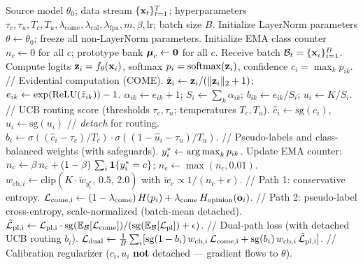 \begin{algorithm}[t]
\caption{UCDPA: Uncertainty-Calibrated Dual-Path Adaptation}
\label{alg:ucdpa}
\begin{algorithmic}[1]
\Require Source model $\theta_0$; data stream $\{\mathbf{x}_t\}_{t=1}^{T}$; hyperparameters $\tau_c, \tau_u, T_c, T_u, \lambda_\mathrm{come}, \lambda_\mathrm{cal}, \lambda_\mathrm{fpa}, m, \beta, \mathrm{lr}$; batch size $B$.
\State Initialize LayerNorm parameters $\theta \leftarrow \theta_0$; freeze all non-LayerNorm parameters.
\State Initialize EMA class counter $n_c \leftarrow 0$ for all $c$; prototype bank $\boldsymbol{\mu}_c \leftarrow \mathbf{0}$ for all $c$.
  \State Receive batch $\mathcal{B}_t = \{\mathbf{x}_i\}_{i=1}^{B}$.
  \State Compute logits $\mathbf{z}_i = f_\theta(\mathbf{x}_i)$, softmax $p_i = \operatorname{softmax}(\mathbf{z}_i)$, confidence $c_i = \max_k p_{ik}$.
  \State // Evidential computation (COME).
  \State $\tilde{\mathbf{z}}_i \leftarrow \mathbf{z}_i / (\|\mathbf{z}_i\|_2 + 1)$;\; $e_{ik} \leftarrow \exp(\operatorname{ReLU}(\tilde{z}_{ik})) - 1$.
  \State $\alpha_{ik} \leftarrow e_{ik} + 1$;\; $S_i \leftarrow \sum_k \alpha_{ik}$;\; $b_{ik} \leftarrow e_{ik}/S_i$;\; $u_i \leftarrow K/S_i$.
  \State // UCB routing score (thresholds $\tau_c, \tau_u$; temperatures $T_c, T_u$). \label{alg:ucb-detach}
  \State $\hat{c}_i \leftarrow \mathrm{sg}(c_i)$, $\hat{u}_i \leftarrow \mathrm{sg}(u_i)$ \hfill // \emph{detach} for routing.
  \State $b_i \leftarrow \sigma((\hat{c}_i - \tau_c)/T_c) \cdot \sigma((1 - \hat{u}_i - \tau_u)/T_u)$.
  \State // Pseudo-labels and class-balanced weights (with safeguards).
  \State $y_i^* \leftarrow \operatorname*{arg\,max}_k p_{ik}$.
  \State Update EMA counter: $n_c \leftarrow \beta\, n_c + (1-\beta)\, \sum_{i} \mathbf{1}\{y_i^*=c\}$; $n_c \leftarrow \max(n_c, 0.01)$.
  \State $w_{\mathrm{cb},i} \leftarrow \mathrm{clip}(K \cdot \tilde{w}_{y_i^*},\, 0.5,\, 2.0)$ with $\tilde{w}_c \propto 1/(n_c + \epsilon)$.
  \State // Path 1: conservative entropy.
  \State $\mathcal{L}_\mathrm{come,i} \leftarrow (1-\lambda_\mathrm{come})\,H(p_i) + \lambda_\mathrm{come}\,H_\mathrm{opinion}(\mathbf{o}_i)$.
  \State // Path 2: pseudo-label cross-entropy, scale-normalized (batch-mean detached).
  \State $\tilde{\mathcal{L}}_\mathrm{pl,i} \leftarrow \mathcal{L}_\mathrm{pl,i} \cdot \mathrm{sg}(\mathbb{E}_\mathcal{B}[\mathcal{L}_\mathrm{come}]) / (\mathrm{sg}(\mathbb{E}_\mathcal{B}[\mathcal{L}_\mathrm{pl}]) + \epsilon)$.
  \State // Dual-path loss (with detached UCB routing $b_i$).
  \State $\mathcal{L}_\mathrm{dual} \leftarrow \tfrac{1}{B}\sum_i [\mathrm{sg}(1-b_i)\,w_{\mathrm{cb},i}\,\mathcal{L}_\mathrm{come,i} + \mathrm{sg}(b_i)\,w_{\mathrm{cb},i}\,\tilde{\mathcal{L}}_\mathrm{pl,i}]$.
  \State // Calibration regularizer ($c_i, u_i$ \textbf{not} detached --- gradient flows to $\theta$). \label{alg:cal-no-detach}

\end{algorithmic}
\end{algorithm}

